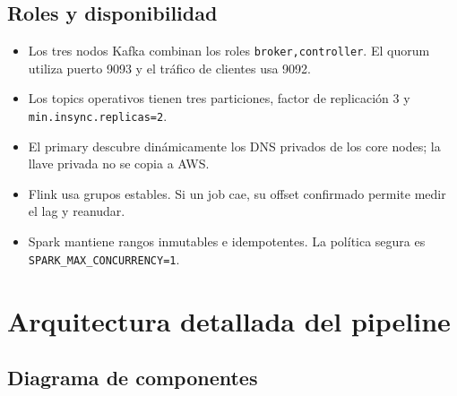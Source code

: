 \documentclass[11pt,a4paper,openany]{report}
\newcommand{\topic}[1]{\texttt{#1}}
\begin{document}
\section{Roles y disponibilidad}

\begin{itemize}
  \item Los tres nodos Kafka combinan los roles \topic{broker,controller}. El quorum utiliza puerto 9093 y el tráfico de clientes usa 9092.
  \item Los topics operativos tienen tres particiones, factor de replicación 3 y \topic{min.insync.replicas=2}.
  \item El primary descubre dinámicamente los DNS privados de los core nodes; la llave privada no se copia a AWS.
  \item Flink usa grupos estables. Si un job cae, su offset confirmado permite medir el lag y reanudar.
  \item Spark mantiene rangos inmutables e idempotentes. La política segura es \topic{SPARK\_MAX\_CONCURRENCY=1}.
\end{itemize}

\chapter{Arquitectura detallada del pipeline}

\section{Diagrama de componentes}
\end{document}
